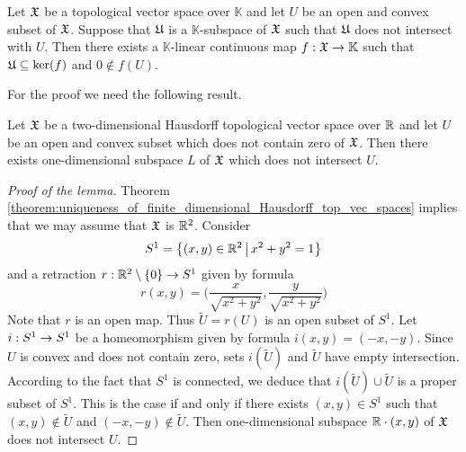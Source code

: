 \begin{theorem}[Mazur]\label{theorem:Mazurs_hyperplane_separation}
   Let ${\mathfrak X}$ be a topological vector space over $\mathbb{K}$ and let $U$ be an open and convex subset of ${\mathfrak X}$. Suppose that ${\mathfrak U}$ is a $\mathbb{K}$-subspace of ${\mathfrak X}$ such that ${\mathfrak U}$ does not intersect with $U$. Then there exists a $\mathbb{K}$-linear continuous map $f:{\mathfrak X}\rightarrow \mathbb{K}$ such that ${\mathfrak U} \subseteq \mathrm{ker}(f)$ and $0 \not \in f(U)$.
\end{theorem}
\noindent
For the proof we need the following result.

\begin{lemma}\label{lemma:two_dimensional_hyperplane_separation}
   Let ${\mathfrak X}$ be a two-dimensional Hausdorff topological vector space over ${\mathbb R}$ and let $U$ be an open and convex subset which does not contain zero of ${\mathfrak X}$. Then there exists one-dimensional subspace $L$ of ${\mathfrak X}$ which does not intersect $U$.
\end{lemma}
\begin{proof}[Proof of the lemma]
   Theorem \ref{theorem:uniqueness_of_finite_dimensional_Hausdorff_top_vec_spaces} implies that we may assume that ${\mathfrak X}$ is ${\mathbb R}^2$. Consider
   $$S^1 = \big\{(x, y)\in {\mathbb R}^2\,\big|\,x^2 + y^2 = 1\big\}$$
   and a retraction $r:{\mathbb R}^2\setminus \{0\} \rightarrow S^1$ given by formula
   $$r(x, y) = \bigg(\frac{x}{\sqrt{x^2 + y^2}},\frac{y}{\sqrt{x^2 + y^2}}\bigg)$$
   Note that $r$ is an open map. Thus $\tilde{U} = r(U)$ is an open subset of $S^1$. Let $i:S^1\rightarrow S^1$ be a homeomorphism given by formula $i(x, y) = (-x, -y)$. Since $U$ is convex and does not contain zero, sets $i(\tilde{U})$ and $\tilde{U}$ have empty intersection. According to the fact that $S^1$ is connected, we deduce that $i(\tilde{U}) \cup \tilde{U}$ is a proper subset of $S^1$. This is the case if and only if there exists $(x, y) \in S^1$ such that $(x, y) \not \in \tilde{U}$ and $(-x, -y) \not \in \tilde{U}$. Then one-dimensional subspace ${\mathbb R} \cdot (x, y)$ of ${\mathfrak X}$ does not intersect $U$.
\end{proof}

